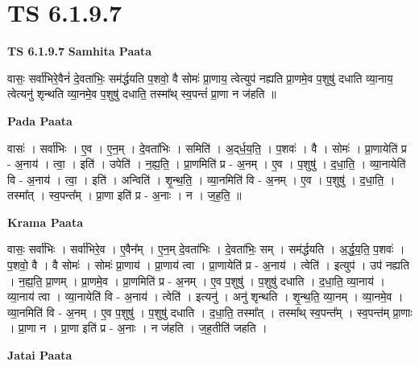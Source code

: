 \documentclass[17pt]{extarticle}
\begin{document}
\section{ TS 6.1.9.7 }

\textbf{TS 6.1.9.7 } \newline
\textbf{Samhita Paata} \newline

वासः॒ सर्वा॑भिरे॒वैनं॑ दे॒वता॑भिः॒ सम॑र्द्धयति प॒शवो॒ वै सोमः॑ प्रा॒णाय॒ त्वेत्युप॑ नह्यति प्रा॒णमे॒व प॒शुषु॑ दधाति व्या॒नाय॒ त्वेत्यनु॑ शृन्थति व्या॒नमे॒व प॒शुषु॑ दधाति॒ तस्मा᳚थ् स्व॒पन्तं॑ प्रा॒णा न ज॑हति ॥ \newline

\textbf{Pada Paata} \newline

वासः॑ । सर्वा॑भिः । ए॒व । ए॒न॒म् । दे॒वता॑भिः । समिति॑ । अ॒द्‌र्ध॒य॒ति॒ । प॒शवः॑ । वै । सोमः॑ । प्रा॒णायेति॑ प्र - अ॒नाय॑ । त्वा॒ । इति॑ । उपेति॑ । न॒ह्य॒ति॒ । प्रा॒णमिति॑ प्र - अ॒नम् । ए॒व । प॒शुषु॑ । द॒धा॒ति॒ । व्या॒नायेति॑ वि - अ॒नाय॑ । त्वा॒ । इति॑ । अन्विति॑ । शृ॒न्थ॒ति॒ । व्या॒नमिति॑ वि - अ॒नम् । ए॒व । प॒शुषु॑ । द॒धा॒ति॒ । तस्मा᳚त् । स्व॒पन्त᳚म् । प्रा॒णा इति॑ प्र - अ॒नाः । न । ज॒ह॒ति॒ ॥  \newline


\textbf{Krama Paata} \newline

वासः॒ सर्वा॑भिः । सर्वा॑भिरे॒व । ए॒वैन᳚म् । ए॒न॒म् दे॒वता॑भिः । दे॒वता॑भिः॒ सम् । सम॑र्द्धयति । अ॒र्द्ध॒य॒ति॒ प॒शवः॑ । प॒शवो॒ वै । वै सोमः॑ । सोमः॑ प्रा॒णाय॑ । प्रा॒णाय॑ त्वा । प्रा॒णायेति॑ प्र - अ॒नाय॑ । त्वेति॑ । इत्युप॑ । उप॑ नह्यति । न॒ह्य॒ति॒ प्रा॒णम् । प्रा॒णमे॒व । प्रा॒णमिति॑ प्र - अ॒नम् । ए॒व प॒शुषु॑ । प॒शुषु॑ दधाति । द॒धा॒ति॒ व्या॒नाय॑ । व्या॒नाय॑ त्वा । व्या॒नायेति॑ वि - अ॒नाय॑ । त्वेति॑ । इत्यनु॑ । अनु॑ शृन्थति । शृ॒न्थ॒ति॒ व्या॒नम् । व्या॒नमे॒व । व्या॒नमिति॑ वि - अ॒नम् । ए॒व प॒शुषु॑ । प॒शुषु॑ दधाति । द॒धा॒ति॒ तस्मा᳚त् । तस्मा᳚थ् स्व॒पन्त᳚म् । स्व॒पन्त॑म् प्रा॒णाः । प्रा॒णा न । प्रा॒णा इति॑ प्र - अ॒नाः । न ज॑हति । ज॒ह॒तीति॑ जहति । \newline

\textbf{Jatai Paata} \newline
\end{document}
